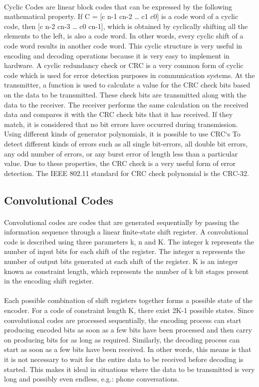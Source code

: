 \documentclass[14pt]{report}
\begin{document}
{\paragraph{} Cyclic Codes are linear block codes that can be expressed by the following mathematical property. If C = [c n-1 cn-2 … c1 c0] is a code word of a cyclic code, then [c n-2 cn-3 … c0 cn-1], which is obtained by cyclically shifting all the elements to the left, is also a code word. In other words, every cyclic shift of a code word results in another code word. This cyclic structure is very useful in encoding and decoding operations because it is very easy to implement in hardware. A cyclic redundancy check or CRC is a very common form of cyclic code which is used for error detection purposes in communication systems. At the transmitter, a function is used to calculate a value for the CRC check bits based on the data to be transmitted. These check bits are transmitted along with the data to the receiver. The receiver performs the same calculation on the received data and compares it with the CRC check bits that it has received. If they match, it is considered that no bit errors have occurred during transmission. Using different kinds of generator polynomials, it is possible to use CRC‘s
To detect different kinds of errors such as all single bit-errors, all double bit errors, any odd number of errors, or any burst error of length less than a particular value. Due to these properties, the CRC check is a very useful form of error detection. The IEEE 802.11 standard for CRC check polynomial is the CRC-32.
\subsection{Convolutional Codes}
\paragraph{} Convolutional codes are codes that are generated sequentially by passing the information sequence through a linear finite-state shift register. A convolutional code is described using three parameters k, n and K. The integer k represents the number of input bits for each shift of the register. The integer n represents the number of output bits generated at each shift of the register. K is an integer known as constraint length, which represents the number of k bit stages present in the encoding shift register.
\paragraph{} Each possible combination of shift registers together forms a possible state of the encoder. For a code of constraint length K, there exist 2K-1 possible states. Since convolutional codes are processed sequentially, the encoding process can start producing encoded bits as soon as a few bits have been processed and then carry on producing bits for as long as required. Similarly, the decoding process can start as soon as a few bits have been received. In other words, this means is that it is not necessary to wait for the entire data to be received before decoding is started. This makes it ideal in situations where the data to be transmitted is very long and possibly even endless, e.g.: phone conversations.
}
\end{document}
